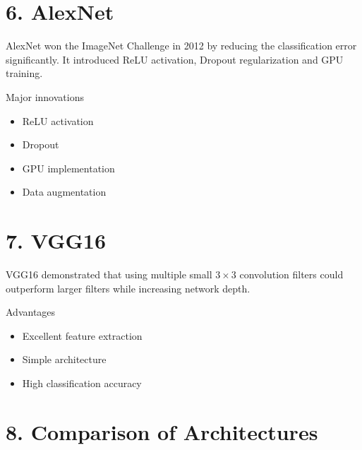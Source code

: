 \documentclass[11pt]{article}
\begin{document}

\section*{6. AlexNet}

AlexNet won the ImageNet Challenge in 2012 by reducing the
classification error significantly. It introduced ReLU activation,
Dropout regularization and GPU training.

Major innovations

\begin{itemize}

\item ReLU activation

\item Dropout

\item GPU implementation

\item Data augmentation

\end{itemize}


\section*{7. VGG16}

VGG16 demonstrated that using multiple small $3\times3$ convolution
filters could outperform larger filters while increasing network depth.

Advantages

\begin{itemize}

\item Excellent feature extraction

\item Simple architecture

\item High classification accuracy

\end{itemize}


\section*{8. Comparison of Architectures}
\end{document}
